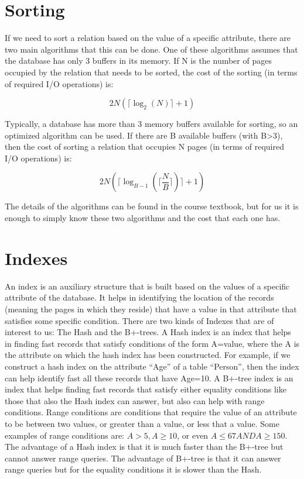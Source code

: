 \documentclass[11pt]{article}
\begin{document}
\section{Sorting}
If we need to sort a relation based on the value of a specific attribute, there are two main algorithms that this can be done. One of these algorithms assumes that the database has only 3 buffers in its memory. If N is the number of pages occupied by the relation that needs to be sorted, the cost of the sorting (in terms of required I/O operations) is:

$$
2N(\lceil \log_2(N)\rceil + 1)
$$


Typically, a database has more than 3 memory buffers available for sorting, so an optimized algorithm can be used. If there are B available buffers (with B>3), then the cost of sorting a relation that occupies N pages (in terms of required I/O operations) is:

$$
2N(\lceil \log_{B - 1}(\lceil\frac{N}{B}\rceil)\rceil + 1)
$$

The details of the algorithms can be found in the course textbook, but for us it is enough to simply know these two algorithms and the cost that each one has.

\section{Indexes}

An index is an auxiliary structure that is built based on the values of a specific attribute of the database. It helps in identifying the location of the records (meaning the pages in which they reside) that have a value in that attribute that satisfies some specific condition. There are two kinds of Indexes that are of interest to us: The Hash and the B+-trees.
A Hash index is an index that helps in finding fast records that satisfy conditions of the form A=value, where the A is the attribute on which the hash index has been constructed. For example, if we construct a hash index on the attribute “Age” of a table “Person”, then the index can help identify fast all these records that have Age=10.
A B+-tree index is an index that helps finding fast records that satisfy either equality conditions like those that also the Hash index can answer, but also can help with range conditions. Range conditions are conditions that require the value of an attribute to be between two values, or greater than a value, or less that a value. Some examples of range conditions are: $A > 5, A \ge 10$, or even $A \le 67 AND A \ge 150$.
The advantage of a Hash index is that it is much faster than the B+-tree but cannot answer range queries. The advantage of B+-tree is that it can answer range queries but for the equality conditions it is slower than the Hash.
\end{document}
